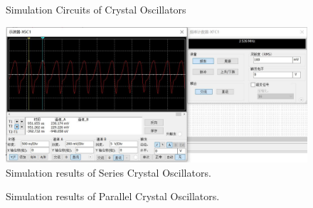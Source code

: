 \documentclass[conference]{IEEEtran}
\begin{document}
\begin{figure}[!h]
\centering
{}
\quad
{}
\caption{Simulation Circuits of Crystal Oscillators}
\label{fig5-9/10}
\end{figure}


\begin{figure}[!h]
\centerline{\includegraphics[scale=0.2]{fig/pic5-12.jpg}}
\caption{Simulation results of Series Crystal Oscillators.}
\label{fig5-12}
\end{figure}

\begin{figure}[!h]
\centering
{}
\quad
{}
\caption{Simulation results of Parallel Crystal Oscillators.}
\label{fig5-13/14}
\end{figure}
\end{document}
